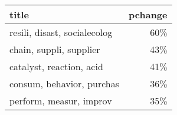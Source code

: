 \begin{tabular}{p{1.2cm}r}
\toprule
                        title &  pchange \\
\midrule
 resili, disast, socialecolog &      60\% \\
      chain, suppli, supplier &      43\% \\
     catalyst, reaction, acid &      41\% \\
    consum, behavior, purchas &      36\% \\
      perform, measur, improv &      35\% \\
\bottomrule
\end{tabular}
